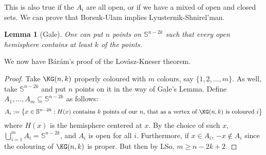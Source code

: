 \documentclass[12pt, a4paper]{book}
\newtheorem{lemma}[theorem]{Lemma}
\theoremstyle{nonumberplain}
\newtheorem{proof}{Proof}
\begin{document}
This is also true if the $A_i$ are all open, or if we have a mixed of open and closed sets.
We can prove that Borsuk-Ulam implies Lyusternik-Shnirel'man.
\begin{lemma}[Gale]
    One can put $n$ points on $\mathbb{S}^{n-2k}$ such that every open hemisphere contains at least $k$ of the points.
\end{lemma}
We now have B\'ar\'am's proof of the Lov\'asz-Kneser theorem.
\begin{proof}
    Take $\KG(n,k)$ properly coloured with $m$ colours, say $\{1,2,\ldots,m\}$.
    As well, take $\mathbb{S}^{n-2k}$ and put $n$ points on it in the way of Gale's Lemma.
    Define $A_1,\ldots,A_m\subseteq \mathbb{S}^{n-2k}$ as follows:
    \[A_i:=\left\{x\in\mathbb{S}^{n-2k}:H(x)\text{ contains $k$ points of our $n$, that as a vertex of $\KG(n,k)$ is coloured $i$}\right\}\]
    where $H(x)$ is the hemisphere centered at $x$.
    By the choice of such $x$, $\bigcup_{i=1}^m A_i=\mathbb{S}^{n-2k}$, and $A_i$ is open for all $i$.
    Furthermore, if $x\in A_i$, $-x\notin A_i$ since the colouring of $\KG(n,k)$ is proper.
    But then by LSo, $m\geq n-2k+2$.
\end{proof}
\end{document}
